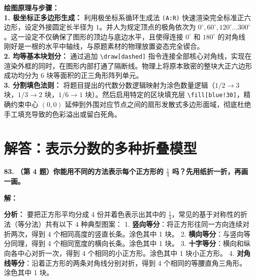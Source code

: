 \vspace{0.4cm}
{\small\color{blue!70!black}
\textbf{绘图原理与步骤：}\\
\textbf{1. 极坐标正多边形生成：} 利用极坐标系循环生成法 \texttt{(A:R)} 快速渲染完全标准正六边形，设定外接圆定长半径为 $1$。并人为规定顶点的极角依次为 $0^\circ, 60^\circ, 120^\circ \dots 300^\circ$。这一设定不仅确保了图形的顶边与底边水平，且使得连接 $0^\circ$ 和 $180^\circ$ 的对角线刚好是一根的水平中轴线，与原题素材的物理放置姿态完全锲合。\\
\textbf{2. 均等基本块划分：} 通过追加 \texttt{\textbackslash draw[dashed]} 指令连接全部核心对角线，实现在渲染外框的同时，在图形内部打通了隔断线。物理上将原本致密的整块大正六边形成功均分为 $6$ 块等面积的正三角形阵列单元。\\
\textbf{3. 分割填色法则：} 将题目提出的代数分数逻辑映射为涂色数量逻辑（$1/2\to 3$ 块，$1/3\to 2$ 块，$1/6\to 1$ 块）。然后启用特定的区块填充层 \texttt{\textbackslash fill[blue!30]}，精确约束中心 $(0,0)$ 延伸到外围对应节点之间的扇形发散式多边形面域，彻底杜绝手工填充导致的色彩溢出或留白死角。
}

\newpage



\section{解答：表示分数的多种折叠模型}

\vspace{0.6cm}

\textbf{\LARGE 83.} \textbf{（第 4 题）你能用不同的方法表示每个正方形的 $\displaystyle\frac{1}{4}$ 吗？先用纸折一折，再画一画。}

\vspace{0.4cm}
\textbf{解：}

\textbf{分析：}
要把正方形平均分成 $4$ 份并着色表示出其中的 $\displaystyle\frac{1}{4}$，常见的基于对称性的折法（等分法）共有以下 4 种典型图案：
1. \textbf{竖向等分}：将正方形往同一方向连续对折两次，得到 4 个相同高度的竖直长条。涂色其中 1 块。
2. \textbf{横向等分}：与竖向等分同理，得到 4 个相同宽度的横向长条。涂色其中 1 块。
3. \textbf{十字等分}：横向和纵向各中心对折一次，得到 4 个相同的小正方形。涂色其中 1 块小正方形。
4. \textbf{对角线等分}：沿着正方形的两条对角线分别对折，得到 4 个相同的等腰直角三角形。涂色其中 1 块。

